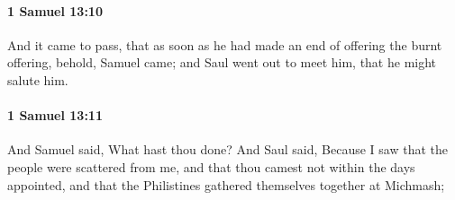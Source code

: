 		\paragraph{1 Samuel 13:10} %
			\label{1SAMUEL-13-10}

			And it came to pass, that as soon as he had made an end of offering the burnt offering, behold, Samuel came; and Saul went out to meet him, that he might salute him.


		\paragraph{1 Samuel 13:11} %
			\label{1SAMUEL-13-11}

			And Samuel said, What hast thou done? And Saul said, Because I saw that the people were scattered from me, and that thou camest not within the days appointed, and that the Philistines gathered themselves together at Michmash;

